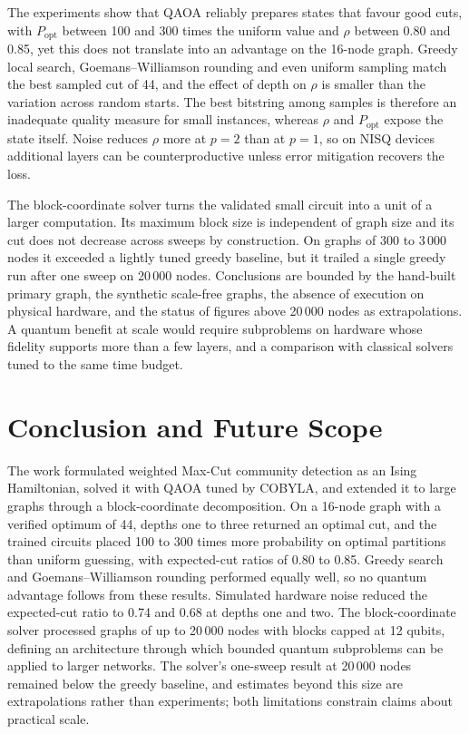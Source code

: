 \documentclass[pdflatex,sn-mathphys-num]{sn-jnl}
\theoremstyle{thmstyleone}
\theoremstyle{thmstyletwo}
\theoremstyle{thmstylethree}
\begin{document}
The experiments show that QAOA reliably prepares states that favour good cuts, with $P_{\mathrm{opt}}$ between 100 and 300 times the uniform value and $\rho$ between 0.80 and 0.85, yet this does not translate into an advantage on the 16-node graph. Greedy local search, Goemans--Williamson rounding and even uniform sampling match the best sampled cut of 44, and the effect of depth on $\rho$ is smaller than the variation across random starts. The best bitstring among samples is therefore an inadequate quality measure for small instances, whereas $\rho$ and $P_{\mathrm{opt}}$ expose the state itself. Noise reduces $\rho$ more at $p=2$ than at $p=1$, so on NISQ devices additional layers can be counterproductive unless error mitigation recovers the loss.

The block-coordinate solver turns the validated small circuit into a unit of a larger computation. Its maximum block size is independent of graph size and its cut does not decrease across sweeps by construction. On graphs of 300 to 3\,000 nodes it exceeded a lightly tuned greedy baseline, but it trailed a single greedy run after one sweep on 20\,000 nodes. Conclusions are bounded by the hand-built primary graph, the synthetic scale-free graphs, the absence of execution on physical hardware, and the status of figures above 20\,000 nodes as extrapolations. A quantum benefit at scale would require subproblems on hardware whose fidelity supports more than a few layers, and a comparison with classical solvers tuned to the same time budget.

\section{Conclusion and Future Scope}\label{sec:conclusion}

The work formulated weighted Max-Cut community detection as an Ising Hamiltonian, solved it with QAOA tuned by COBYLA, and extended it to large graphs through a block-coordinate decomposition. On a 16-node graph with a verified optimum of 44, depths one to three returned an optimal cut, and the trained circuits placed 100 to 300 times more probability on optimal partitions than uniform guessing, with expected-cut ratios of 0.80 to 0.85. Greedy search and Goemans--Williamson rounding performed equally well, so no quantum advantage follows from these results. Simulated hardware noise reduced the expected-cut ratio to 0.74 and 0.68 at depths one and two. The block-coordinate solver processed graphs of up to 20\,000 nodes with blocks capped at 12 qubits, defining an architecture through which bounded quantum subproblems can be applied to larger networks. The solver's one-sweep result at 20\,000 nodes remained below the greedy baseline, and estimates beyond this size are extrapolations rather than experiments; both limitations constrain claims about practical scale.
\end{document}
